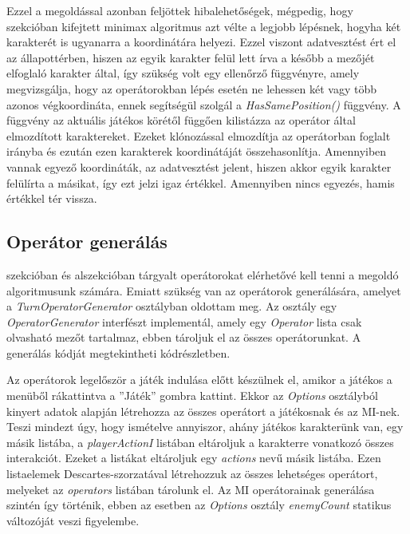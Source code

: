 \documentclass[
]{thesis-ekf}
\theoremstyle{definition}
\theoremstyle{remark}
\begin{document}
Ezzel a megoldással azonban feljöttek hibalehetőségek, mégpedig, hogy  szekcióban kifejtett minimax algoritmus azt vélte a legjobb lépésnek, hogyha két karakterét is ugyanarra a koordinátára helyezi. Ezzel viszont adatvesztést ért el az állapottérben, hiszen az egyik karakter felül lett írva a később a mezőjét elfoglaló karakter által, így szükség volt egy ellenőrző függvényre, amely megvizsgálja, hogy az operátorokban lépés esetén ne lehessen két vagy több azonos végkoordináta, ennek segítségül szolgál a \emph{HasSamePosition()} függvény. A függvény az aktuális játékos körétől függően kilistázza az operátor által elmozdított karaktereket. Ezeket klónozással elmozdítja az operátorban foglalt irányba és ezután ezen karakterek koordinátáját összehasonlítja. Amennyiben vannak egyező koordináták, az adatvesztést jelent, hiszen akkor egyik karakter felülírta a másikat, így ezt jelzi igaz értékkel. Amennyiben nincs egyezés, hamis értékkel tér vissza.

\subsection{Operátor generálás} \label{operatorgen}

 szekcióban és  alszekcióban tárgyalt operátorokat elérhetővé kell tenni a megoldó algoritmusunk számára. Emiatt szükség van az operátorok generálására, amelyet a \emph{TurnOperatorGenerator} osztályban oldottam meg. Az osztály egy \emph{OperatorGenerator} interfészt implementál, amely egy \emph{Operator} lista csak olvasható mezőt tartalmaz, ebben tároljuk el az összes operátorunkat. A generálás kódját megtekintheti  kódrészletben.

Az operátorok legelőször a játék indulása előtt készülnek el, amikor a játékos a menüből rákattintva a ''Játék'' gombra kattint. Ekkor az \emph{Options} osztályból kinyert adatok alapján létrehozza az összes operátort a játékosnak és az MI-nek. Teszi mindezt úgy, hogy ismételve annyiszor, ahány játékos karakterünk van, egy másik listába, a \emph{playerActionI} listában eltároljuk a karakterre vonatkozó összes interakciót. Ezeket a listákat eltároljuk egy \emph{actions} nevű másik listába. Ezen listaelemek Descartes-szorzatával létrehozzuk az összes lehetséges operátort, melyeket az \emph{operators} listában tárolunk el. Az MI operátorainak generálása szintén így történik, ebben az esetben az \emph{Options} osztály \emph{enemyCount} statikus változóját veszi figyelembe.
\end{document}
